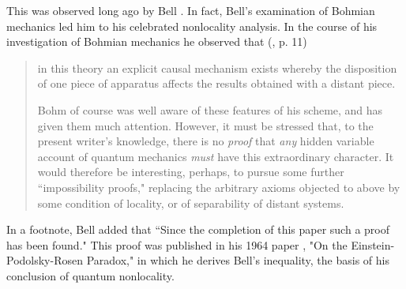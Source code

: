 \documentclass[12pt]{article}
\begin{document}
This was observed long ago by Bell \cite{Bel66}.  In fact, Bell's
examination of Bohmian mechanics led him to his celebrated nonlocality
analysis. In the course of his investigation of Bohmian mechanics he
observed that (\cite{Bel87}, p.  11)
\begin{quotation}\small\noindent
   in this theory an explicit causal mechanism exists whereby the
   disposition of one piece of apparatus affects the results obtained
   with a distant piece.

   Bohm of course was well aware of these features of his scheme, and
   has given them much attention.  However, it must be stressed that,
   to the present writer's knowledge, there is no {\em proof} that {\em
     any} hidden variable account of quantum mechanics {\em must} have
   this extraordinary character. It would therefore be interesting,
   perhaps, to pursue some further ``impossibility proofs," replacing
   the arbitrary axioms objected to above by some condition of
   locality, or of separability of distant systems.
\end{quotation}
\noindent In a footnote, Bell added that ``Since the completion of
this paper such a proof has been found." This proof was published in
his 1964 paper \cite{Bel64}, "On the Einstein-Podolsky-Rosen Paradox,"
in which he derives Bell's inequality, the basis of his conclusion of
quantum nonlocality.
\end{document}
